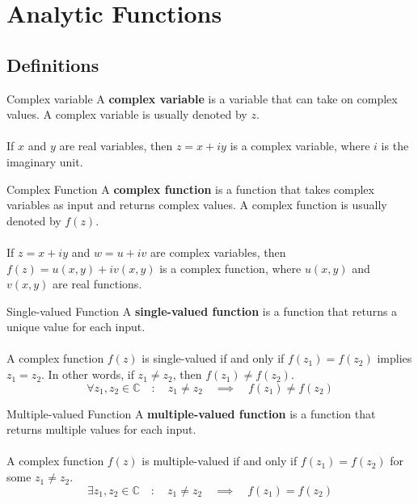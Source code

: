 
\section{Analytic Functions}
\subsection{Definitions}

\begin{definition}{Complex variable}{}
    A \textbf{complex variable} is a variable that can take on complex values. A complex variable is usually denoted by $z$. \\~\\
    
    If $x$ and $y$ are real variables, then $z = x + iy$ is a complex variable, where $i$ is the imaginary unit.
\end{definition}

\begin{definition}{Complex Function}{}
    A \textbf{complex function} is a function that takes complex variables as input and returns complex values. A complex function is usually denoted by $f(z)$. \\~\\

    If $z = x + iy$ and $w = u + iv$ are complex variables, then $f(z) = u(x, y) + iv(x, y)$ is a complex function, where $u(x, y)$ and $v(x, y)$ are real functions.
\end{definition}

\begin{definition}{Single-valued Function}{}
    A \textbf{single-valued function} is a function that returns a unique value for each input. \\~\\
    
    A complex function $f(z)$ is single-valued if and only if $f(z_1) = f(z_2)$ implies $z_1 = z_2$. In other words, if $z_1 \neq z_2$, then $f(z_1) \neq f(z_2)$.
    \[
        \forall z_1, z_2 \in \mathbb{C} \quad : \quad z_1 \neq z_2 \quad \implies \quad f(z_1) \neq f(z_2)
    \] 
\end{definition}

\begin{definition}{Multiple-valued Function}{}
    A \textbf{multiple-valued function} is a function that returns multiple values for each input. \\~\\
    
    A complex function $f(z)$ is multiple-valued if and only if $f(z_1) = f(z_2)$ for some $z_1 \neq z_2$.
    \[
        \exists z_1, z_2 \in \mathbb{C} \quad : \quad z_1 \neq z_2 \quad \implies \quad f(z_1) = f(z_2)
    \] 
\end{definition}

